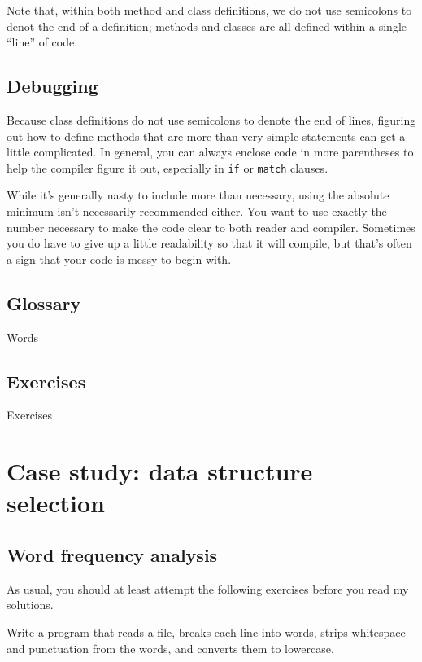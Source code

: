 \documentclass[10pt]{book}
\begin{document}
{Note that, within both method and class definitions, we do not use semicolons to denot the end of a definition; methods and classes are all defined within a single ``line'' of code.

\section{Debugging}

Because class definitions do not use semicolons to denote the end of lines, figuring out how to define methods that are more than very simple statements can get a little complicated. In general, you can always enclose code in more parentheses to help the compiler figure it out, especially in {\tt if} or {\tt match} clauses.

While it's generally nasty to include more than necessary, using the absolute minimum isn't necessarily recommended either. You want to use exactly the number necessary to make the code clear to both reader and compiler. Sometimes you do have to give up a little readability so that it will compile, but that's often a sign that your code is messy to begin with.

\section{Glossary}

Words

\section{Exercises}

Exercises


\chapter{Case study: data structure selection}

\section{Word frequency analysis}
\label{analysis}

As usual, you should at least attempt the following exercises
before you read my solutions.

\begin{ex}
Write a program that reads a file, breaks each line into
words, strips whitespace and punctuation from the words, and
converts them to lowercase.


\end{ex}}
\end{document}
